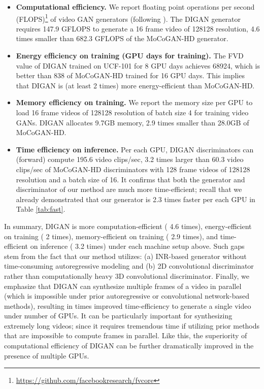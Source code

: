 \documentclass{article} \usepackage{iclr2022_conference,times}
\begin{document}
\begin{itemize}[leftmargin=0.2in]
    \item \textbf{Computational efficiency.} 
    We report floating point operations per second (FLOPS)\footnote{\url{ https://github.com/facebookresearch/fvcore}} of video GAN generators (following \citet{liu2021content}). The DIGAN generator requires 147.9 GFLOPS to generate a 16 frame video of 128128 resolution, 4.6 times smaller than 682.3 GFLOPS of the MoCoGAN-HD generator. 

    \item \textbf{Energy efficiency on training (GPU days for training).} The FVD value of DIGAN trained on UCF-101 for 8 GPU days achieves 68924, which is better than 838 of MoCoGAN-HD trained for 16 GPU days. This implies that DIGAN is (at least 2 times) more energy-efficient than MoCoGAN-HD.

    \item \textbf{Memory efficiency on training.} We report the memory size per GPU to load 16 frame videos of 128128 resolution of batch size 4 for training video GANs. DIGAN allocates 9.7GB memory, 2.9 times smaller than 28.0GB of MoCoGAN-HD.	


    \item \textbf{Time efficiency on inference.} Per each GPU, DIGAN discriminators can (forward) compute 195.6 video clips/sec, 3.2 times larger than 60.3 video clips/sec of MoCoGAN-HD discriminators with 128 frame videos of 128128 resolution and a batch size of 16. It confirms that both the generator and discriminator of our method are much more time-efficient; recall that we already demonstrated that our generator is 2.3 times faster per each GPU in Table \ref{tab:fast}.
\end{itemize}
In summary, DIGAN is more computation-efficient ( 4.6 times), energy-efficient on training  ( 2 times), memory-efficient on training ( 2.9 times), and time-efficient on inference ( 3.2 times) under each machine setup above. Such gaps stem from the fact that our method utilizes: (a) INR-based generator without time-consuming autoregressive modeling and (b) 2D convolutional discriminator rather than computationally heavy 3D convolutional discriminator. Finally, we emphasize that DIGAN can synthesize multiple frames of a video in parallel (which is impossible under prior autoregressive or convolutional network-based methods), resulting in  times improved time-efficiency to generate a single video under  number of GPUs. It can be particularly important for synthesizing extremely long videos; since it requires tremendous time if utilizing prior methods that are impossible to compute frames in parallel. Like this, the superiority of computational efficiency of DIGAN can be further dramatically improved in the presence of multiple GPUs.
\end{document}
